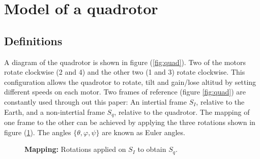 \documentclass[conference]{IEEEtran}
\newcommand{\refp}[1]{(\ref{#1})}
\begin{document}
 

\section{Model of a quadrotor}
\label{sec:modelo}

\subsection{Definitions}
\label{sec:modelo-defs}

A diagram of the quadrotor is shown in figure \refp{fig:quad}. Two of the motors rotate clockwise (2 and 4) and the other two (1 and 3) rotate clockwise. This configuration allows the quadrotor to rotate, tilt and gain/lose altitud by setting different speeds on each motor. Two frames of reference (figure \ref{fig:quad}) are constantly used through out this paper: An intertial frame $S_I$, relative to the Earth, and a non-intertial frame $S_q$, relative to the quadrotor. The mapping of one frame to the other can be achieved by applying the three rotations shown in figure \refp{fig:rotaciones}. The angles $\lbrace \theta, \varphi, \psi\rbrace$ are known as Euler angles.

\begin{figure} [h!]
  \centering
  \caption{\textbf{Mapping:} Rotations applied on $S_I$ to obtain $S_q$.}
  \label{fig:rotaciones}
\end{figure}
\end{document}
